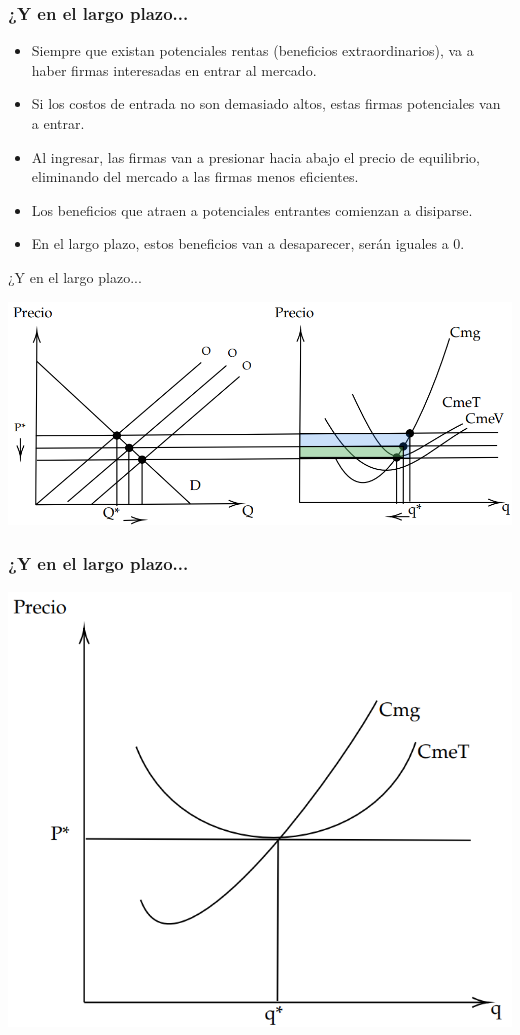 \documentclass{beamer}
\begin{document}
\begin{frame}
\frametitle{¿Y en el largo plazo...}
\begin{itemize}
    \item Siempre que existan potenciales rentas (beneficios extraordinarios), va a haber firmas interesadas en entrar al mercado.
    \item Si los costos de entrada no son demasiado altos, estas firmas potenciales van a entrar.
    \item Al ingresar, las firmas van a presionar hacia abajo el precio de equilibrio, eliminando del mercado a las firmas menos eficientes.
    \item Los beneficios que atraen a potenciales entrantes comienzan a disiparse.
    \item En el largo plazo, estos beneficios van a desaparecer, serán iguales a 0.
    \end{itemize}
\end{frame}

\begin{frame}{¿Y en el largo plazo...}
    \begin{center}
    \includegraphics[scale=0.55]{../Figures/C21.6.png}
    \end{center}
\end{frame}

\begin{frame}
    \frametitle{¿Y en el largo plazo...}
    \begin{center}
    \includegraphics[scale=0.6]{../Figures/C21.7.png}
    \end{center}
\end{frame}
\end{document}
